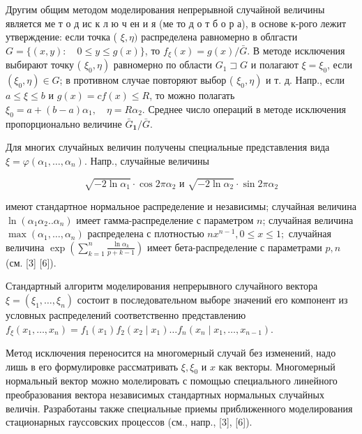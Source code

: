 \documentclass[10pt]{article}
\begin{document}
Другим общим методом моделирования непрерывной случайной величины является ме т о д ис к л ю ч ен и я (ме то д о т б о р а), в основе к-рого лежит утверждение: если точка ( $\xi, \eta)$ распределена равномерно в облгасти $G=\{(x, y): \quad 0 \leqslant y \leqslant g(x)\}$, то $f_{\xi}(x)=g(x) / \bar{G}$. В методе исключения выбирают точку ( $\left.\xi_{0}, \eta\right)$ равномерно по области $G_{1} \sqsupset G$ и полагают $\xi=\xi_{0}$, если $\left(\xi_{0}, \eta\right) \in G$; в противном случае повторяют выбор ( $\left.\xi_{0}, \eta\right)$ и т. д. Напр., если $a \leqslant \xi \leqslant b$ и $g(x)=c f(x) \leqslant R$, то можно полагать $\xi_{0}=a+(b-a) \alpha_{1}, \quad \eta=R \alpha_{2}$. Среднее число операций в методе исключения пропорционально величине $\bar{G}_{\mathbf{1}} / \bar{G}$.



Для многих случайных величин получены специальные представления вида $\xi=\varphi\left(\alpha_{1}, \ldots, \alpha_{n}\right)$. Напр., случайные величины



\[

\sqrt{-2 \ln \alpha_{1}} \cdot \cos 2 \pi \alpha_{2} \text { и } \sqrt{-2 \ln \alpha_{2}} \cdot \sin 2 \pi \alpha_{2}

\]



имеют стандартное нормальное распределение и независимы; случайная величина $\ln \left(\alpha_{1} \alpha_{2} . . \alpha_{n}\right)$ имеет гамма-распределение с параметром $n$; случайная величина $\max \left(\alpha_{1}, \ldots, \alpha_{n}\right)$ распределена с плотностью $n x^{n-1}, 0 \leqslant x \leqslant 1 ;$ случайная величина $\exp \left(\sum_{k=1}^{n} \frac{\ln \alpha_{k}}{p+k-1}\right)$ имеет бета-распределение с параметрами $p, n$ (см. [3] [6]).



Стандартный алгоритм моделирования непрерывного случайного вектора $\xi=\left(\xi_{1}, \ldots, \xi_{n}\right)$ состоит в последовательном выборе значений его компонент из условных распределений соответственно представлению $f_{\xi}\left(x_{1}, \ldots, x_{n}\right)=f_{1}\left(x_{1}\right) f_{2}\left(x_{2} \mid x_{1}\right) \ldots f_{n}\left(x_{n} \mid x_{1}, \ldots, x_{n-1}\right)$.



Метод исключения переносится на многомерный случай без изменений, надо лишь в его формулировке рассматривать $\xi, \xi_{0}$ и $x$ как векторы. Многомерный нормальный вектор можно молелировать с помощью специального линейного преобразования вектора независимых стандартных нормальных случайных величін. Разработаны также специальные приемы приближенного моделирования стационарных гауссовских процессов (см., напр., [3], [6]).
\end{document}
